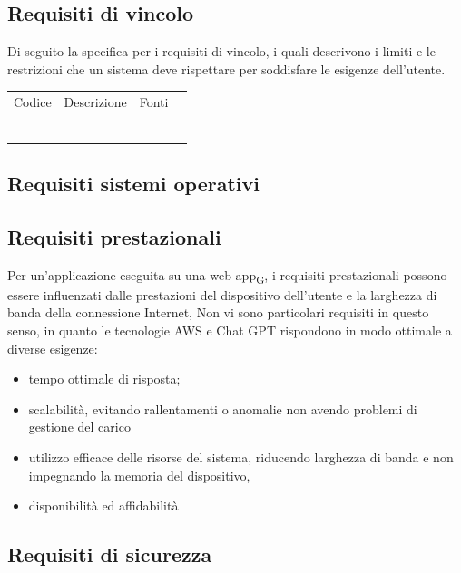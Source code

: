 \documentclass{article}
\begin{document}
\subsection{Requisiti di vincolo}
Di seguito la specifica per i requisiti di vincolo, i quali descrivono i limiti e le restrizioni che un sistema
deve rispettare per soddisfare le esigenze dell'utente. 
\begin{center}

    \begin{tabular}{|p{3cm}|p{6cm}|p{}|p{3cm}|}
    \rowcolor{Blue} 
\hline
Codice & Descrizione & Fonti  \\ 
\rowcolor{LightBlue}
\hline
& &  \\ 
\rowcolor{LighterBlue}
\hline
 & & \\ 
\rowcolor{LightBlue}
\hline
 & & \\
\hline
\rowcolor{LighterBlue}

& & \\
\rowcolor{LightBlue}
\hline
& & \\
\hline
\rowcolor{LighterBlue}

 & & \\
\hline

\end{tabular}
\label{tab:reqvincolo}
\end{center}

\subsection{Requisiti sistemi operativi}


\subsection{Requisiti prestazionali}
Per un'applicazione eseguita su una web app\textsubscript{G}, i requisiti prestazionali possono essere influenzati dalle prestazioni del dispositivo dell'utente e la larghezza di banda della connessione Internet, Non vi sono particolari requisiti in questo senso, in quanto le tecnologie AWS e Chat GPT rispondono in modo ottimale a diverse esigenze:
\begin{itemize}
\item tempo ottimale di risposta;
\item scalabilità, evitando rallentamenti o anomalie non avendo problemi di gestione del carico 
\item utilizzo efficace delle risorse del sistema, riducendo larghezza di banda e non impegnando la memoria del dispositivo, 
\item disponibilità ed affidabilità
\end{itemize}

\subsection{Requisiti di sicurezza}







   
\end{document}
